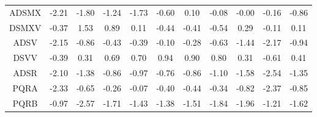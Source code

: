 \begin{longtable}{ | c || c | c | c | c | c | c | c | c | c || c |}
ADSMX &  \cellcolor[HTML]{FFC7C7} -2.21 &  \cellcolor[HTML]{FFCFCF} -1.80 &  \cellcolor[HTML]{FFDFDF} -1.24 &  \cellcolor[HTML]{FFD7D7} -1.73 &  \cellcolor[HTML]{FFEFEF} -0.60 &  \cellcolor[HTML]{FFFFFF} 0.10 &  \cellcolor[HTML]{FFFFFF} -0.08 &  \cellcolor[HTML]{FFFFFF} -0.00 &  \cellcolor[HTML]{FFFFFF} -0.16 &  \cellcolor[HTML]{FFE7E7} -0.86 \\
DSMXV &  \cellcolor[HTML]{FFF7F7} -0.37 &  \cellcolor[HTML]{D7D7FF} 1.53 &  \cellcolor[HTML]{E7E7FF} 0.89 &  \cellcolor[HTML]{FFFFFF} 0.11 &  \cellcolor[HTML]{FFF7F7} -0.44 &  \cellcolor[HTML]{FFF7F7} -0.41 &  \cellcolor[HTML]{FFEFEF} -0.54 &  \cellcolor[HTML]{F7F7FF} 0.29 &  \cellcolor[HTML]{FFFFFF} -0.11 &  \cellcolor[HTML]{FFFFFF} 0.11 \\
ADSV &  \cellcolor[HTML]{FFC7C7} -2.15 &  \cellcolor[HTML]{FFE7E7} -0.86 &  \cellcolor[HTML]{FFF7F7} -0.43 &  \cellcolor[HTML]{FFF7F7} -0.39 &  \cellcolor[HTML]{FFFFFF} -0.10 &  \cellcolor[HTML]{FFF7F7} -0.28 &  \cellcolor[HTML]{FFEFEF} -0.63 &  \cellcolor[HTML]{FFD7D7} -1.44 &  \cellcolor[HTML]{FFC7C7} -2.17 &  \cellcolor[HTML]{FFE7E7} -0.94 \\
DSVV &  \cellcolor[HTML]{FFF7F7} -0.39 &  \cellcolor[HTML]{F7F7FF} 0.31 &  \cellcolor[HTML]{EFEFFF} 0.69 &  \cellcolor[HTML]{EFEFFF} 0.70 &  \cellcolor[HTML]{E7E7FF} 0.94 &  \cellcolor[HTML]{E7E7FF} 0.90 &  \cellcolor[HTML]{E7E7FF} 0.80 &  \cellcolor[HTML]{F7F7FF} 0.31 &  \cellcolor[HTML]{FFEFEF} -0.61 &  \cellcolor[HTML]{F7F7FF} 0.41 \\
ADSR &  \cellcolor[HTML]{FFC7C7} -2.10 &  \cellcolor[HTML]{FFDFDF} -1.38 &  \cellcolor[HTML]{FFE7E7} -0.86 &  \cellcolor[HTML]{FFE7E7} -0.97 &  \cellcolor[HTML]{FFEFEF} -0.76 &  \cellcolor[HTML]{FFE7E7} -0.86 &  \cellcolor[HTML]{FFE7E7} -1.10 &  \cellcolor[HTML]{FFD7D7} -1.58 &  \cellcolor[HTML]{FFBFBF} -2.54 &  \cellcolor[HTML]{FFDFDF} -1.35 \\
PQRA &  \cellcolor[HTML]{FFC7C7} -2.33 &  \cellcolor[HTML]{FFEFEF} -0.65 &  \cellcolor[HTML]{FFF7F7} -0.26 &  \cellcolor[HTML]{FFFFFF} -0.07 &  \cellcolor[HTML]{FFF7F7} -0.40 &  \cellcolor[HTML]{FFF7F7} -0.44 &  \cellcolor[HTML]{FFF7F7} -0.34 &  \cellcolor[HTML]{FFE7E7} -0.82 &  \cellcolor[HTML]{FFC7C7} -2.37 &  \cellcolor[HTML]{FFE7E7} -0.85 \\
PQRB &  \cellcolor[HTML]{FFE7E7} -0.97 &  \cellcolor[HTML]{FFBFBF} -2.57 &  \cellcolor[HTML]{FFD7D7} -1.71 &  \cellcolor[HTML]{FFD7D7} -1.43 &  \cellcolor[HTML]{FFDFDF} -1.38 &  \cellcolor[HTML]{FFD7D7} -1.51 &  \cellcolor[HTML]{FFCFCF} -1.84 &  \cellcolor[HTML]{FFCFCF} -1.96 &  \cellcolor[HTML]{FFDFDF} -1.21 &  \cellcolor[HTML]{FFD7D7} -1.62 \\

\end{longtable}
